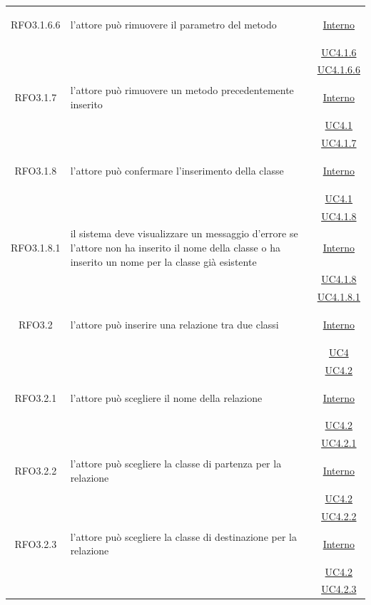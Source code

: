 \begin{longtable}{|c|>{\centering}m{7cm}|c|}
\hypertarget{RFO3.1.6.6}{RFO3.1.6.6} & l'attore può rimuovere il parametro del metodo & \hyperlink{Interno}{Interno}\\
& &\hyperref[UC4.1.6]{UC4.1.6}\\
& &\hyperref[UC4.1.6.6]{UC4.1.6.6}\\ \hline

\hypertarget{RFO3.1.7}{RFO3.1.7} & l'attore può rimuovere un metodo precedentemente inserito & \hyperlink{Interno}{Interno}\\
& &\hyperref[UC4.1]{UC4.1}\\
& &\hyperref[UC4.1.7]{UC4.1.7}\\ \hline

\hypertarget{RFO3.1.8}{RFO3.1.8} & l'attore può confermare l'inserimento della classe & \hyperlink{Interno}{Interno}\\
& &\hyperref[UC4.1]{UC4.1}\\
& &\hyperref[UC4.1.8]{UC4.1.8}\\ \hline

\hypertarget{RFO3.1.8.1}{RFO3.1.8.1} & il sistema deve visualizzare un messaggio d'errore se l'attore non ha inserito il nome della classe o ha inserito un nome per la classe già esistente &  \hyperlink{Interno}{Interno}\\
& &\hyperref[UC4.1.8]{UC4.1.8}\\
& &\hyperref[UC4.1.8.1]{UC4.1.8.1}\\ \hline

\hypertarget{RFO3.2}{RFO3.2} & l'attore può inserire una relazione tra due classi & \hyperlink{Interno}{Interno}\\
& &\hyperref[UC4]{UC4}\\
& &\hyperref[UC4.2]{UC4.2}\\ \hline

\hypertarget{RFO3.2.1}{RFO3.2.1} & l'attore può scegliere il nome della relazione & \hyperlink{Interno}{Interno}\\
& &\hyperref[UC4.2]{UC4.2}\\
& &\hyperref[UC4.2.1]{UC4.2.1}\\ \hline

\hypertarget{RFO3.2.2}{RFO3.2.2} & l'attore può scegliere la classe di partenza per la relazione & \hyperlink{Interno}{Interno}\\
& &\hyperref[UC4.2]{UC4.2}\\
& &\hyperref[UC4.2.2]{UC4.2.2}\\ \hline

\hypertarget{RFO3.2.3}{RFO3.2.3} & l'attore può scegliere la classe di destinazione per la relazione & \hyperlink{Interno}{Interno}\\
& &\hyperref[UC4.2]{UC4.2}\\
& &\hyperref[UC4.2.3]{UC4.2.3}\\ \hline


\end{longtable}
